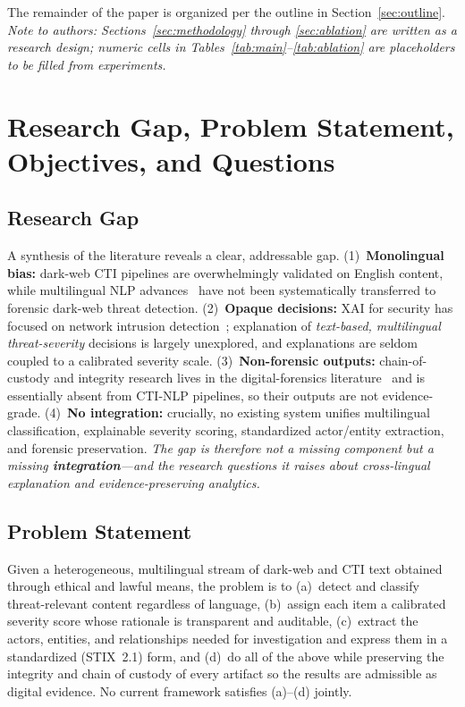 \documentclass[11pt,a4paper]{article}
\begin{document}
The remainder of the paper is organized per the outline in
Section~\ref{sec:outline}. \emph{Note to authors: Sections~\ref{sec:methodology}
through \ref{sec:ablation} are written as a research design; numeric cells in
Tables~\ref{tab:main}--\ref{tab:ablation} are placeholders to be filled from
experiments.}

\section{Research Gap, Problem Statement, Objectives, and Questions}\label{sec:gap}

\subsection{Research Gap}
A synthesis of the literature reveals a clear, addressable gap. (1)~\textbf{Monolingual
bias:} dark-web CTI pipelines are overwhelmingly validated on English content, while
multilingual NLP advances~\cite{pakray2025nlp,nazir2025multilingual,alharbi2025bert}
have not been systematically transferred to forensic dark-web threat detection.
(2)~\textbf{Opaque decisions:} XAI for security has focused on network intrusion
detection~\cite{gaspar2024xai,hermosilla2025xai,kalakoti2025evaluating}; explanation of
\emph{text-based, multilingual threat-severity} decisions is largely unexplored, and
explanations are seldom coupled to a calibrated severity scale.
(3)~\textbf{Non-forensic outputs:} chain-of-custody and integrity research lives in the
digital-forensics literature~\cite{lone2019forensicchain,loffi2025management,ali2022procedure}
and is essentially absent from CTI-NLP pipelines, so their outputs are not evidence-grade.
(4)~\textbf{No integration:} crucially, no existing system unifies multilingual
classification, explainable severity scoring, standardized actor/entity extraction, and
forensic preservation. \emph{The gap is therefore not a missing component but a missing
\textbf{integration}---and the research questions it raises about cross-lingual
explanation and evidence-preserving analytics.}

\subsection{Problem Statement}
Given a heterogeneous, multilingual stream of dark-web and CTI text obtained through
ethical and lawful means, the problem is to (a)~detect and classify threat-relevant
content regardless of language, (b)~assign each item a calibrated severity score whose
rationale is transparent and auditable, (c)~extract the actors, entities, and
relationships needed for investigation and express them in a standardized
(STIX~2.1) form, and (d)~do all of the above while preserving the integrity and chain
of custody of every artifact so the results are admissible as digital evidence.
No current framework satisfies (a)--(d) jointly.
\end{document}
